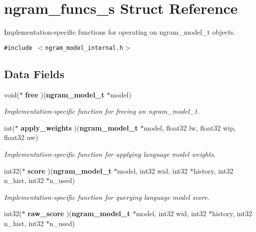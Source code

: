 \section{ngram\_\-funcs\_\-s Struct Reference}
\label{structngram__funcs__s}
Implementation-specific functions for operating on ngram\_\-model\_\-t objects.  


{\tt \#include $<$ngram\_\-model\_\-internal.h$>$}

\subsection*{Data Fields}
\begin{CompactItemize}
\item 
void($\ast$ {\bf free} )({\bf ngram\_\-model\_\-t} $\ast$model)\label{structngram__funcs__s_4211130880131f38e16022985816952f}

\begin{CompactList}\small\item\em Implementation-specific function for freeing an ngram\_\-model\_\-t. \item\end{CompactList}\item 
int($\ast$ {\bf apply\_\-weights} )({\bf ngram\_\-model\_\-t} $\ast$model, float32 lw, float32 wip, float32 uw)\label{structngram__funcs__s_bfd7e53c672aef5a34ec5114ec475916}

\begin{CompactList}\small\item\em Implementation-specific function for applying language model weights. \item\end{CompactList}\item 
int32($\ast$ {\bf score} )({\bf ngram\_\-model\_\-t} $\ast$model, int32 wid, int32 $\ast$history, int32 n\_\-hist, int32 $\ast$n\_\-used)\label{structngram__funcs__s_81b0c7948179c2572fb274401b82278e}

\begin{CompactList}\small\item\em Implementation-specific function for querying language model score. \item\end{CompactList}\item 
int32($\ast$ {\bf raw\_\-score} )({\bf ngram\_\-model\_\-t} $\ast$model, int32 wid, int32 $\ast$history, int32 n\_\-hist, int32 $\ast$n\_\-used)\label{structngram__funcs__s_2a64c66491914168bd830237cc93b16c}


\end{CompactItemize}

